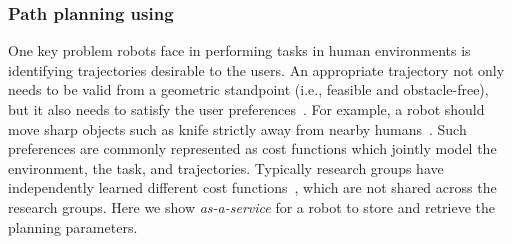\subsubsection{Path planning using \robobrain{}}
\label{sec:applicationplanit}

One key problem robots face in performing tasks in human environments is identifying trajectories desirable to the users. An appropriate trajectory not only needs to be valid from a geometric standpoint (i.e., feasible and obstacle-free), but it also needs to satisfy the user preferences~\citep{jainsaxena2013_trajectorypreferences,Jain14}. For example,  a robot should move sharp objects such as knife strictly away from nearby humans~\cite{jain_contextdrivenpathplanning_2013}. Such preferences are commonly represented as cost functions which jointly model the environment, the task, and trajectories.
Typically research groups have independently learned different cost functions~\citep{jainsaxena2013_trajectorypreferences,Kuderer-RSS-12,KitaniECCV2012}, which are not shared across the research groups. Here we show \robobrain{} \textit{as-a-service}  for a robot to store and retrieve the planning parameters.

